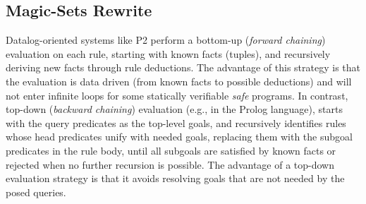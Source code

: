 {%

\subsection{Magic-Sets Rewrite}
\label{ch:evita:sec:magic}

Datalog-oriented systems like P2 perform a bottom-up (\emph{forward chaining})
evaluation on each rule, starting with known facts (tuples), and recursively
deriving new facts through rule deductions.  The advantage of this strategy is
that the evaluation is data driven (from known facts to possible deductions)
and will not enter infinite loops for some statically verifiable \emph{safe}
programs.  In contrast, top-down (\emph{backward chaining}) evaluation (e.g.,
in the Prolog language), starts with the query predicates as the top-level
goals, and recursively identifies rules whose head predicates unify with needed
goals, replacing them with the subgoal predicates in the rule body, until all
subgoals are satisfied by known facts or rejected when no further recursion is
possible.  The advantage of a top-down evaluation strategy is that it avoids
resolving goals that are not needed by the posed queries.

}
